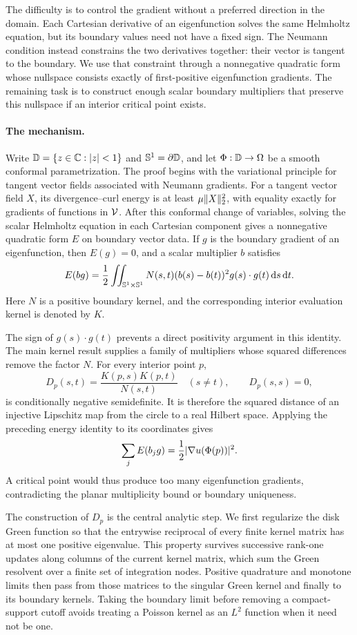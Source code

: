 The difficulty is to control the gradient without a preferred direction in the domain. Each Cartesian derivative of an eigenfunction solves the same Helmholtz equation, but its boundary values need not have a fixed sign. The Neumann condition instead constrains the two derivatives together: their vector is tangent to the boundary. We use that constraint through a nonnegative quadratic form whose nullspace consists exactly of first-positive eigenfunction gradients. The remaining task is to construct enough scalar boundary multipliers that preserve this nullspace if an interior critical point exists.

\paragraph{The mechanism.}
Write $\mathbb D=\{z\in\mathbb C:|z|<1\}$ and $\mathbb S^1=\partial\mathbb D$, and let $\Phi:\mathbb D\to\Omega$ be a smooth conformal parametrization. The proof begins with the variational principle for tangent vector fields associated with Neumann gradients. For a tangent vector field $X$, its divergence--curl energy is at least $\mu\lVert X\rVert_2^2$, with equality exactly for gradients of functions in $\mathcal V$. After this conformal change of variables, solving the scalar Helmholtz equation in each Cartesian component gives a nonnegative quadratic form $E$ on boundary vector data. If $g$ is the boundary gradient of an eigenfunction, then $E(g)=0$, and a scalar multiplier $b$ satisfies
\[
E(bg)=\frac12\iint_{\mathbb S^1\times\mathbb S^1}
N(s,t)(b(s)-b(t))^2g(s)\cdot g(t)\,\mathrm d s\,\mathrm d t.
\]
Here $N$ is a positive boundary kernel, and the corresponding interior evaluation kernel is denoted by $K$.

The sign of $g(s)\cdot g(t)$ prevents a direct positivity argument in this identity. The main kernel result supplies a family of multipliers whose squared differences remove the factor $N$. For every interior point $p$,
\[
D_p(s,t)=\frac{K(p,s)K(p,t)}{N(s,t)}\quad(s\ne t),
\qquad D_p(s,s)=0,
\]
is conditionally negative semidefinite. It is therefore the squared distance of an injective Lipschitz map from the circle to a real Hilbert space. Applying the preceding energy identity to its coordinates gives
\[
\sum_j E(b_jg)=\frac12|\nabla u(\Phi(p))|^2.
\]
A critical point would thus produce too many eigenfunction gradients, contradicting the planar multiplicity bound or boundary uniqueness.

The construction of $D_p$ is the central analytic step. We first regularize the disk Green function so that the entrywise reciprocal of every finite kernel matrix has at most one positive eigenvalue. This property survives successive rank-one updates along columns of the current kernel matrix, which sum the Green resolvent over a finite set of integration nodes. Positive quadrature and monotone limits then pass from those matrices to the singular Green kernel and finally to its boundary kernels. Taking the boundary limit before removing a compact-support cutoff avoids treating a Poisson kernel as an $L^2$ function when it need not be one.

